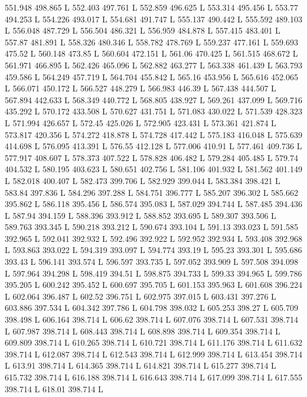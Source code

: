 551.948 498.865 L
552.403 497.761 L
552.859 496.625 L
553.314 495.456 L
553.77 494.253 L
554.226 493.017 L
554.681 491.747 L
555.137 490.442 L
555.592 489.103 L
556.048 487.729 L
556.504 486.321 L
556.959 484.878 L
557.415 483.401 L
557.87 481.891 L
558.326 480.346 L
558.782 478.769 L
559.237 477.161 L
559.693 475.52 L
560.148 473.85 L
560.604 472.151 L
561.06 470.425 L
561.515 468.672 L
561.971 466.895 L
562.426 465.096 L
562.882 463.277 L
563.338 461.439 L
563.793 459.586 L
564.249 457.719 L
564.704 455.842 L
565.16 453.956 L
565.616 452.065 L
566.071 450.172 L
566.527 448.279 L
566.983 446.39 L
567.438 444.507 L
567.894 442.633 L
568.349 440.772 L
568.805 438.927 L
569.261 437.099 L
569.716 435.292 L
570.172 433.508 L
570.627 431.751 L
571.083 430.022 L
571.539 428.323 L
571.994 426.657 L
572.45 425.026 L
572.905 423.431 L
573.361 421.874 L
573.817 420.356 L
574.272 418.878 L
574.728 417.442 L
575.183 416.048 L
575.639 414.698 L
576.095 413.391 L
576.55 412.128 L
577.006 410.91 L
577.461 409.736 L
577.917 408.607 L
578.373 407.522 L
578.828 406.482 L
579.284 405.485 L
579.74 404.532 L
580.195 403.623 L
580.651 402.756 L
581.106 401.932 L
581.562 401.149 L
582.018 400.407 L
582.473 399.706 L
582.929 399.044 L
583.384 398.421 L
583.84 397.836 L
584.296 397.288 L
584.751 396.777 L
585.207 396.302 L
585.662 395.862 L
586.118 395.456 L
586.574 395.083 L
587.029 394.744 L
587.485 394.436 L
587.94 394.159 L
588.396 393.912 L
588.852 393.695 L
589.307 393.506 L
589.763 393.345 L
590.218 393.212 L
590.674 393.104 L
591.13 393.023 L
591.585 392.965 L
592.041 392.932 L
592.496 392.922 L
592.952 392.934 L
593.408 392.968 L
593.863 393.022 L
594.319 393.097 L
594.774 393.19 L
595.23 393.301 L
595.686 393.43 L
596.141 393.574 L
596.597 393.735 L
597.052 393.909 L
597.508 394.098 L
597.964 394.298 L
598.419 394.51 L
598.875 394.733 L
599.33 394.965 L
599.786 395.205 L
600.242 395.452 L
600.697 395.705 L
601.153 395.963 L
601.608 396.224 L
602.064 396.487 L
602.52 396.751 L
602.975 397.015 L
603.431 397.276 L
603.886 397.534 L
604.342 397.786 L
604.798 398.032 L
605.253 398.27 L
605.709 398.498 L
606.164 398.714 L
606.62 398.714 L
607.076 398.714 L
607.531 398.714 L
607.987 398.714 L
608.443 398.714 L
608.898 398.714 L
609.354 398.714 L
609.809 398.714 L
610.265 398.714 L
610.721 398.714 L
611.176 398.714 L
611.632 398.714 L
612.087 398.714 L
612.543 398.714 L
612.999 398.714 L
613.454 398.714 L
613.91 398.714 L
614.365 398.714 L
614.821 398.714 L
615.277 398.714 L
615.732 398.714 L
616.188 398.714 L
616.643 398.714 L
617.099 398.714 L
617.555 398.714 L
618.01 398.714 L
